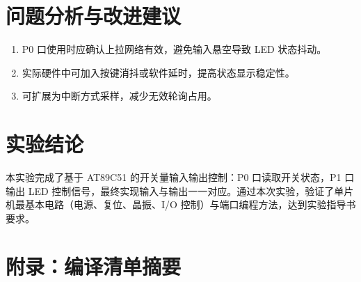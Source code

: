 \section{问题分析与改进建议}
\begin{enumerate}
  \item P0 口使用时应确认上拉网络有效，避免输入悬空导致 LED 状态抖动。
  \item 实际硬件中可加入按键消抖或软件延时，提高状态显示稳定性。
  \item 可扩展为中断方式采样，减少无效轮询占用。
\end{enumerate}

\section{实验结论}
本实验完成了基于 AT89C51 的开关量输入输出控制：P0 口读取开关状态，P1 口输出 LED 控制信号，最终实现输入与输出一一对应。通过本次实验，验证了单片机最基本电路（电源、复位、晶振、I/O 控制）与端口编程方法，达到实验指导书要求。

\appendix
\section{附录：编译清单摘要}
\lstset{style=a51style}

